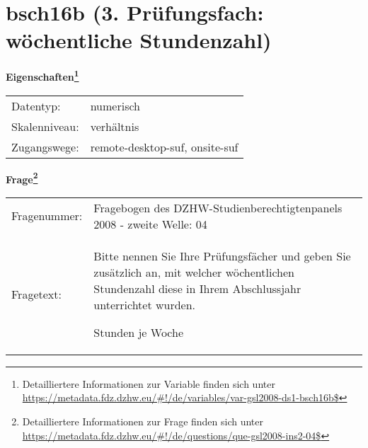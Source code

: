 
    \setcounter{footnote}{0}

    \vspace*{-1.8cm}
	\section{bsch16b (3. Prüfungsfach: wöchentliche Stundenzahl)}
	\label{section:bsch16b}



    \vspace*{0.5cm}
    \noindent\textbf{Eigenschaften\footnote{Detailliertere Informationen zur Variable finden sich unter
		\url{https://metadata.fdz.dzhw.eu/\#!/de/variables/var-gsl2008-ds1-bsch16b$}}}\\
	\begin{tabularx}{\hsize}{@{}lX}
	Datentyp: & numerisch \\
	Skalenniveau: & verhältnis \\
	Zugangswege: &
	  remote-desktop-suf, 
	  onsite-suf
 \\
    \end{tabularx}



				\vspace*{0.5cm}
                \noindent\textbf{Frage\footnote{Detailliertere Informationen zur Frage finden sich unter
		              \url{https://metadata.fdz.dzhw.eu/\#!/de/questions/que-gsl2008-ins2-04$}}}\\
				\begin{tabularx}{\hsize}{@{}lX}
					Fragenummer: &
					  Fragebogen des DZHW-Studienberechtigtenpanels 2008 - zweite Welle:
					  04
 \\
					Fragetext: & Bitte nennen Sie Ihre Prüfungsfächer und geben Sie zusätzlich an, mit welcher wöchentlichen Stundenzahl diese in Ihrem Abschlussjahr unterrichtet wurden.\par  Stunden je Woche \\
				\end{tabularx}





